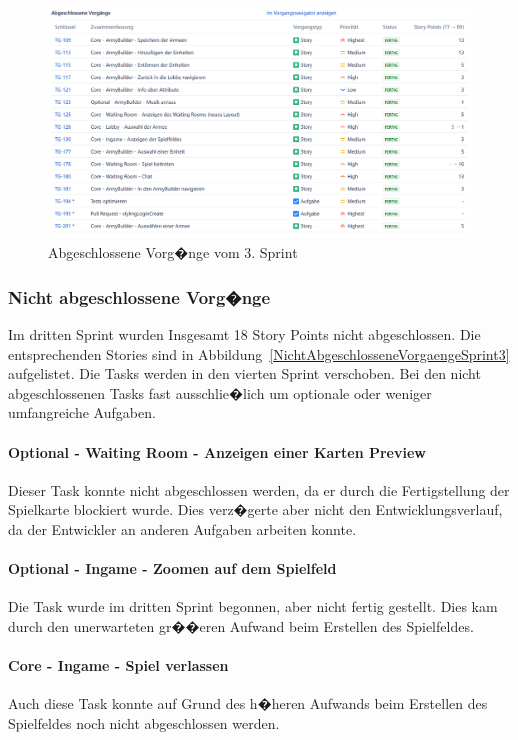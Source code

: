 \documentclass[12pt, titlepage]{scrartcl}
\newcommand{\Abb}[1]{%
	Abbildung\ \ref{#1}%
}
\begin{document}
		\begin{figure}[H] 
			\centering
			\includegraphics[width=1\textwidth]{Abschlossene_Vorgaenge_Sprint_3.png}
			\caption{Abgeschlossene Vorg�nge vom 3. Sprint}
			\label{AbgeschlosseneVorgaengeSprint3}
		\end{figure}
	
		\subsubsection{Nicht abgeschlossene Vorg�nge}
		Im dritten Sprint wurden Insgesamt 18 Story Points nicht abgeschlossen. Die entsprechenden Stories sind in \Abb{NichtAbgeschlosseneVorgaengeSprint3} aufgelistet. Die Tasks werden in den vierten Sprint verschoben. Bei den nicht abgeschlossenen Tasks fast ausschlie�lich um optionale oder weniger umfangreiche Aufgaben.
			
			\paragraph{Optional - Waiting Room - Anzeigen einer Karten Preview}
			Dieser Task konnte nicht abgeschlossen werden, da er durch die Fertigstellung der Spielkarte blockiert wurde. Dies verz�gerte aber nicht den Entwicklungsverlauf, da der Entwickler an anderen Aufgaben arbeiten konnte. 
			
			\paragraph{Optional - Ingame - Zoomen auf dem Spielfeld}
			Die Task wurde im dritten Sprint begonnen, aber nicht fertig gestellt. Dies kam durch den unerwarteten gr��eren Aufwand beim Erstellen des Spielfeldes.
			
			\paragraph{Core - Ingame - Spiel verlassen}
			Auch diese Task konnte auf Grund des h�heren Aufwands beim Erstellen des Spielfeldes noch nicht abgeschlossen werden. 
			
\end{document}

